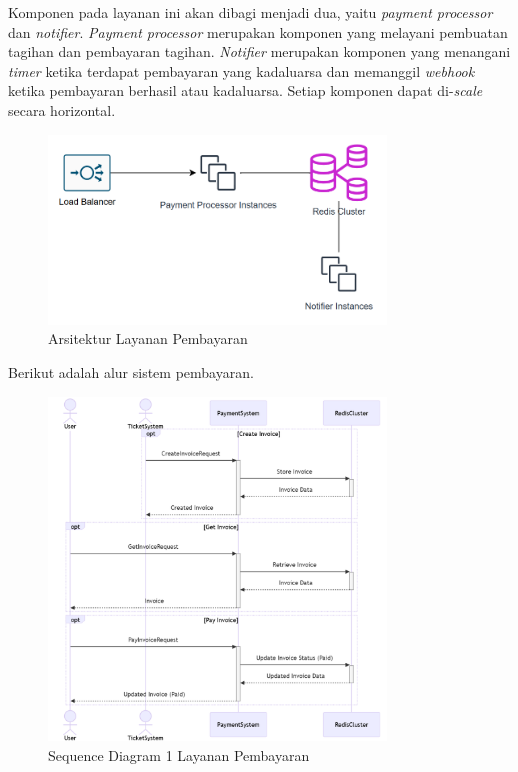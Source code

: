 Komponen pada layanan ini akan dibagi menjadi dua, yaitu \textit{payment processor} dan \textit{notifier}. \textit{Payment processor} merupakan komponen yang melayani pembuatan tagihan dan pembayaran tagihan. \textit{Notifier} merupakan komponen yang menangani \textit{timer} ketika terdapat pembayaran yang kadaluarsa dan  memanggil \textit{webhook} ketika pembayaran berhasil atau kadaluarsa. Setiap komponen dapat di-\textit{scale} secara horizontal.

\begin{figure}[htbp]
    \centering
    \includegraphics[width=0.8\textwidth]{resources/chapter-3/payment-service.png}
    \caption{Arsitektur Layanan Pembayaran}
    \label{fig:payment-service-deployment}
\end{figure}

Berikut adalah alur sistem pembayaran.

\begin{figure}[htbp]
    \centering
    \includegraphics[width=0.8\textwidth]{resources/chapter-3/payment-flow1.png}
    \caption{Sequence Diagram 1 Layanan Pembayaran}
    \label{fig:payment-flow1}
\end{figure}


